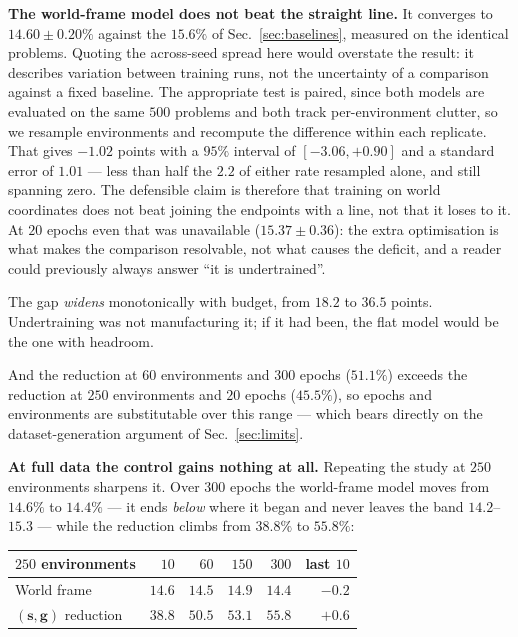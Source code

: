 \documentclass[10pt,twocolumn,letterpaper]{article}
\newcommand{\toprule}{\hline}
\newcommand{\midrule}{\hline}
\newcommand{\bottomrule}{\hline}
\theoremstyle{plain}
\newcommand{\svec}{\mathbf{s}}
\newcommand{\gvec}{\mathbf{g}}
\begin{document}
\textbf{The world-frame model does not beat the straight line.} It converges to
$14.60\pm0.20\%$ against the $15.6\%$ of Sec.~\ref{sec:baselines}, measured on
the identical problems. Quoting the across-seed spread here would overstate the
result: it describes variation between training runs, not the uncertainty of a
comparison against a fixed baseline. The appropriate test is paired, since both
models are evaluated on the same $500$ problems and both track per-environment
clutter, so we resample environments and recompute the difference within each
replicate. That gives $-1.02$ points with a $95\%$ interval of
$[-3.06, +0.90]$ and a standard error of $1.01$ --- less than half the $2.2$ of
either rate resampled alone, and still spanning zero. The defensible claim is
therefore that training on world coordinates does not beat joining the endpoints
with a line, not that it loses to it. At $20$ epochs even that was unavailable
($15.37\pm0.36$): the extra optimisation is what makes the comparison resolvable,
not what causes the deficit, and a reader could previously always answer ``it is
undertrained''.

The gap \emph{widens} monotonically with budget, from $18.2$ to $36.5$ points.
Undertraining was not manufacturing it; if it had been, the flat model would be the
one with headroom.

And the reduction at $60$ environments and $300$ epochs ($51.1\%$) exceeds the
reduction at $250$ environments and $20$ epochs ($45.5\%$), so epochs and
environments are substitutable over this range --- which bears directly on the
dataset-generation argument of Sec.~\ref{sec:limits}.

\textbf{At full data the control gains nothing at all.} Repeating the study at
$250$ environments sharpens it. Over $300$ epochs the world-frame model moves from
$14.6\%$ to $14.4\%$ --- it ends \emph{below} where it began and never leaves the
band $14.2$--$15.3$ --- while the reduction climbs from $38.8\%$ to $55.8\%$:

\begin{center}\small
\begin{tabular}{lrrrrr}
\toprule
$250$ environments & $10$ & $60$ & $150$ & $300$ & last $10$ \\
\midrule
World frame               & $14.6$ & $14.5$ & $14.9$ & $14.4$ & $-0.2$ \\
$(\svec,\gvec)$ reduction & $38.8$ & $50.5$ & $53.1$ & $\mathbf{55.8}$ & $+0.6$ \\
\bottomrule
\end{tabular}
\end{center}
\end{document}
